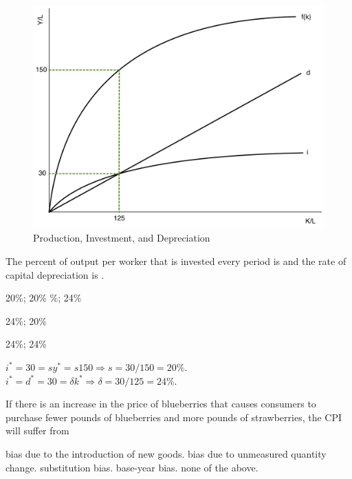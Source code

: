 \documentclass[addpoints,11pt]{exam}
\theoremstyle{definition}
\newcommand{\blank}[0]{\underline{\hspace{3cm}}}
\begin{document}
\begin{questions}
	
	\begin{figure}[H]
		\centering
		\includegraphics[scale=.35]{Final_MC22.pdf}
		\caption{Production, Investment, and Depreciation}
		\label{MC22}
	\end{figure}
	
	The percent of output per worker that is invested every period is \blank and the rate of capital depreciation is \blank.
	
	\begin{choices}
		\item 20\%; 20\%
		\%; 24\%
		\item 24\%; 20\%
		\item 24\%; 24\%
	\end{choices}
	
	\begin{solution} 
		$i^* = 30 = sy^* = s150 \Rightarrow s = 30/150 = 20\%$. $i^* = d^* = 30 = \delta k^* \Rightarrow \delta = 30/125 = 24\%$.
	\end{solution}
	
\newpage
	
	\question If there is an increase in the price of blueberries that causes consumers to purchase fewer pounds of blueberries and more pounds of strawberries, the CPI will suffer from
	
	\begin{choices}
		\choice bias due to the introduction of new goods.
		\choice bias due to unmeasured quantity change.
		\CorrectChoice substitution bias.
		\choice base-year bias.
		\choice none of the above.
	\end{choices}
	

\end{questions}
\end{document}

